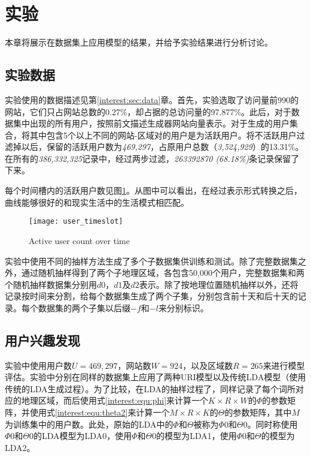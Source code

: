 \section{实验}
\label{interest:sec:exp}

本章将展示在数据集上应用模型的结果，并给予实验结果进行分析讨论。
\subsection{实验数据}
\label{interest:sec:expdata}
实验使用的数据描述见第\ref{interest:sec:data}章。首先，实验选取了访问量前990的网站，它们只占网站总数的0.27\%，却占据的总访问量的97.877\%。此后，对于数据集中出现的所有用户，按照前文描述生成器网站向量表示。对于生成的用户集合，将其中包含5个以上不同的网站-区域对的用户是为活跃用户。将不活跃用户过滤掉以后，保留的活跃用户数为\textit{469,297}，占原用户总数（\textit{3,524,929}）的13.31\%。在所有的\textit{386,332,325}记录中，经过两步过滤，\textit{263392870 (68.18\%)}条记录保留了下来。

每个时间槽内的活跃用户数见图\ref{interest:fig:usercount}。从图中可以看出，在经过表示形式转换之后，曲线能够很好的和现实生活中的生活模式相匹配。

\begin{figure}
\centering
\texttt{[image: user\_timeslot]}
\caption{Active user count over time}
\label{interest:fig:usercount}
\end{figure}

实验中使用不同的抽样方法生成了多个子数据集供训练和测试。除了完整数据集之外，通过随机抽样得到了两个子地理区域，各包含50,000个用户，完整数据集和两个随机抽样数据集分别用$d0$，$d1$及$d2$表示。除了按地理位置随机抽样以外，还将记录按时间来分割，给每个数据集生成了两个子集，分别包含前十天和后十天的记录。每个数据集的两个子集以后缀$-f$和$-l$来分别标识。

\subsection{用户兴趣发现}
实验中使用用户数$U = 469,297$，网站数$W = 924$，以及区域数$R = 265$来进行模型评估。实验中分别在同样的数据集上应用了两种URI模型以及传统LDA模型（使用传统的LDA生成过程）。为了比较，在LDA的抽样过程了，同样记录了每个词所对应的地理区域，而后使用式\ref{interest:equ:phi}来计算一个$K \times R \times W$的$\Phi$的参数矩阵，并使用式\ref{interest:equ:theta2}来计算一个$M \times R \times K$的$\Theta$的参数矩阵，其中$M$为训练集中的用户数。此处，原始的LDA中的$\Phi$和$\Theta$被称为$\Phi0$和$\Theta0$。同时称使用$\Phi0$和$\Theta0$的LDA模型为LDA0，使用$\Phi$和$\Theta0$的模型为LDA1，使用$\Phi0$和$\Theta$的模型为LDA2。

